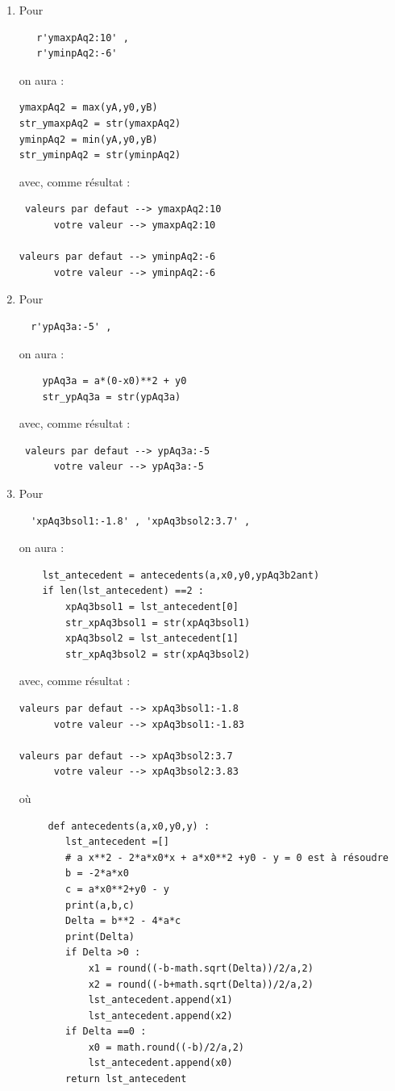 {\begin{enumerate}
 \item Pour 
 \begin{verbatim}
   r'ymaxpAq2:10' , 
   r'yminpAq2:-6' 
\end{verbatim}
on aura :
\begin{verbatim}
ymaxpAq2 = max(yA,y0,yB)
str_ymaxpAq2 = str(ymaxpAq2) 
yminpAq2 = min(yA,y0,yB)
str_yminpAq2 = str(yminpAq2) 
\end{verbatim}
avec, comme résultat : 
\begin{verbatim}
 valeurs par defaut --> ymaxpAq2:10
      votre valeur --> ymaxpAq2:10

valeurs par defaut --> yminpAq2:-6
      votre valeur --> yminpAq2:-6
\end{verbatim}

 \item Pour 
 \begin{verbatim}
  r'ypAq3a:-5' , 
\end{verbatim}
on aura :
\begin{verbatim}
    ypAq3a = a*(0-x0)**2 + y0 
    str_ypAq3a = str(ypAq3a)  
\end{verbatim}
avec, comme résultat : 
\begin{verbatim}
 valeurs par defaut --> ypAq3a:-5
      votre valeur --> ypAq3a:-5
\end{verbatim}

 \item Pour 
 \begin{verbatim}
  'xpAq3bsol1:-1.8' , 'xpAq3bsol2:3.7' , 
\end{verbatim}
on aura :
\begin{verbatim}
    lst_antecedent = antecedents(a,x0,y0,ypAq3b2ant)
    if len(lst_antecedent) ==2 :
        xpAq3bsol1 = lst_antecedent[0]
        str_xpAq3bsol1 = str(xpAq3bsol1) 
        xpAq3bsol2 = lst_antecedent[1]
        str_xpAq3bsol2 = str(xpAq3bsol2) 
\end{verbatim}
avec, comme résultat : 
\begin{verbatim}
valeurs par defaut --> xpAq3bsol1:-1.8
      votre valeur --> xpAq3bsol1:-1.83

valeurs par defaut --> xpAq3bsol2:3.7
      votre valeur --> xpAq3bsol2:3.83 
\end{verbatim}
où 
\begin{verbatim}
     def antecedents(a,x0,y0,y) :
        lst_antecedent =[]
        # a x**2 - 2*a*x0*x + a*x0**2 +y0 - y = 0 est à résoudre
        b = -2*a*x0
        c = a*x0**2+y0 - y
        print(a,b,c)
        Delta = b**2 - 4*a*c
        print(Delta)
        if Delta >0 :
            x1 = round((-b-math.sqrt(Delta))/2/a,2) 
            x2 = round((-b+math.sqrt(Delta))/2/a,2) 
            lst_antecedent.append(x1)
            lst_antecedent.append(x2)
        if Delta ==0 : 
            x0 = math.round((-b)/2/a,2) 
            lst_antecedent.append(x0)
        return lst_antecedent
\end{verbatim}


\end{enumerate}}
